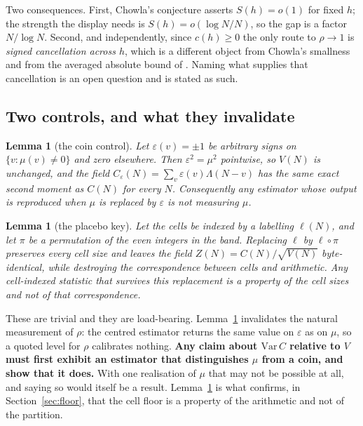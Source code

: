 \documentclass[11pt,a4paper]{article}
\theoremstyle{plain}
\newtheorem{lemma}[theorem]{Lemma}
\theoremstyle{definition}
\begin{document}
Two consequences. First, Chowla's conjecture asserts $S(h)=o(1)$ for
fixed $h$; the strength the display needs is $S(h) = o(\log N/N)$, so
the gap is a factor $N/\log N$. Second, and independently, since
$c(h)\ge0$ the only route to $\rho\to1$ is \emph{signed cancellation
across $h$}, which is a different object from Chowla's smallness and
from the averaged absolute bound of \cite{MRT15}. Naming what supplies
that cancellation is an open question and is stated as such.

\subsection{Two controls, and what they invalidate}

\begin{lemma}[the coin control]\label{lem:coin}
Let $\varepsilon(v)=\pm1$ be arbitrary signs on $\{v : \mu(v)\neq0\}$
and zero elsewhere. Then $\varepsilon^2 = \mu^2$ pointwise, so
$V(N)$ is unchanged, and the field
$C_\varepsilon(N)=\sum_v\varepsilon(v)\Lambda(N-v)$ has the same exact
second moment as $C(N)$ for every $N$. Consequently any estimator whose
output is reproduced when $\mu$ is replaced by $\varepsilon$ is not
measuring $\mu$.
\end{lemma}

\begin{lemma}[the placebo key]\label{lem:placebo}
Let the cells be indexed by a labelling $\ell(N)$, and let $\pi$ be a
permutation of the even integers in the band. Replacing $\ell$ by
$\ell\circ\pi$ preserves every cell size and leaves the field
$Z(N)=C(N)/\sqrt{V(N)}$ byte-identical, while destroying the
correspondence between cells and arithmetic. Any cell-indexed statistic
that survives this replacement is a property of the cell sizes and not
of that correspondence.
\end{lemma}

These are trivial and they are load-bearing. Lemma~\ref{lem:coin}
invalidates the natural measurement of $\rho$: the centred estimator
returns the same value on $\varepsilon$ as on $\mu$, so a quoted level
for $\rho$ calibrates nothing. \textbf{Any claim about
$\mathrm{Var}\,C$ relative to $V$ must first exhibit an estimator that
distinguishes $\mu$ from a coin, and show that it does.} With one
realisation of $\mu$ that may not be possible at all, and saying so
would itself be a result. Lemma~\ref{lem:placebo} is what confirms, in
Section~\ref{sec:floor}, that the cell floor is a property of the
arithmetic and not of the partition.
\end{document}
